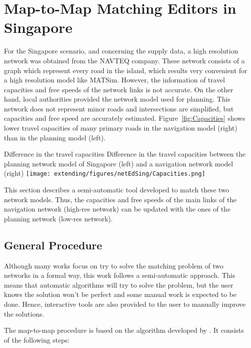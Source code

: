 \section{Map-to-Map Matching Editors in Singapore}
\citet[][]{Ordonez_Webpage_2011_3}
For the Singapore scenario, and concerning the supply data, a high resolution network was obtained from the NAVTEQ company. These network consists of a graph which represent every road in the island, which results very convenient for a high resolution model like MATSim. However, the information of travel capacities and free speeds of the network links is not accurate. On the other hand, local authorities provided the network model used for planning. This network does not represent minor roads and intersections are simplified, but capacities and free speed are accurately estimated. Figure~\ref{fig:Capacities} shows lower travel capacities of many primary roads in the navigation model (right) than in the planning model (left).

\createfigure
{Difference in the travel capacities}
{Difference in the travel capacities between the planning network model of Singapore (left) and a navigation network model (right)}
{\label{fig:Capacities}}
{\texttt{[image: extending/figures/netEdSing/Capacities.png]}}
{}

This section describes a semi-automatic tool developed to match these two network models. Thus, the capacities and free speeds of the main links of the navigation network (high-res network) can be updated with the ones of the planning network (low-res network).

\subsection{General Procedure}
Although many works focus on try to solve the matching problem of two networks in a formal way, this work follows a semi-automatic approach. This means that automatic algorithms will try to solve the problem, but the user knows the solution won't be perfect and some manual work is expected to be done. Hence, interactive tools are also provided to the user to manually improve the solutions.

The map-to-map procedure is based on the algorithm developed by \citet{BalmerEtAl_STRC_2005}. It consists of the following steps:

